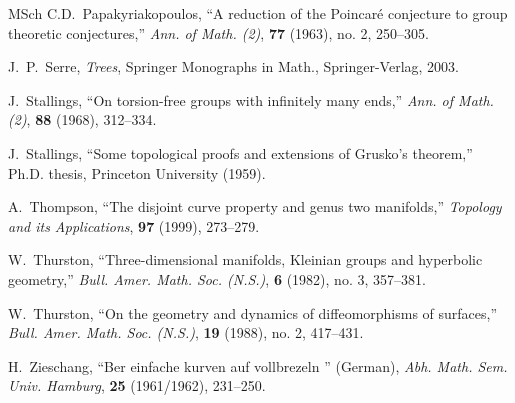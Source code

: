 \begin{thebibliography}{MSch}
 C.D.~Papakyriakopoulos, ``A reduction of the Poincar\'e 
conjecture to group theoretic conjectures,'' {\em Ann. of Math. (2)},
{\bf 77} (1963), no. 2, 250--305. 


 J.~P.~Serre, {\em Trees}, Springer Monographs in 
Math., Springer-Verlag, 2003.

 J.~Stallings, ``On torsion-free groups with infinitely
many ends,'' {\em Ann. of Math. (2)}, {\bf 88} (1968), 312--334.

 J.~Stallings, ``Some topological proofs and extensions of Grusko's theorem,'' Ph.D. thesis, Princeton University (1959).

 A.~Thompson, ``The disjoint curve property and
genus two manifolds,''  {\em Topology and its Applications},
{\bf 97} (1999), 273--279.

 W.~Thurston, ``Three-dimensional manifolds, Kleinian 
groups and hyperbolic geometry,'' {\em Bull. Amer. Math. Soc. (N.S.)},
{\bf 6} (1982), no. 3, 357--381.

 W.~Thurston, ``On the geometry and dynamics of
diffeomorphisms of surfaces,'' {\em Bull. Amer. Math. Soc. (N.S.)},
{\bf 19} (1988), no. 2, 417--431.


 H.~Zieschang, ``Ber einfache kurven auf vollbrezeln '' (German),
{\em Abh. Math. Sem. Univ. Hamburg}, {\bf 25} (1961/1962), 231--250.

\end{thebibliography}
